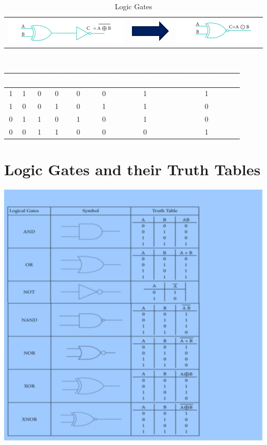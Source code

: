 \documentclass{article}
\begin{document}
\begin{table}[h!]
	\begin{center}
		\caption{Logic Gates}
		\label{tab:table1}
		\begin{tabular}{l c c}
			\includegraphics[width=0.25\linewidth]{xnor}
			&
			\includegraphics[width=0.13\linewidth]{arrow}
			&
			\includegraphics[width=0.25\linewidth]{xnor1}
			\\
		\end{tabular}
	\end{center}
\end{table}
\\
\begin{table}[h!]
	\begin{center}
		\begin{tabular}{ |c|c|c|c|c|c|c|c|}
			\cellcolor{blue!100}\textcolor{white}{\textbf{A}} & \cellcolor{blue!100}\textcolor{white}{\textbf{B}} & \cellcolor{blue!100}\textcolor{white}{\textbf{~A}} &
			\cellcolor{blue!100}\textcolor{white}{\textbf{~B}} &
			\cellcolor{blue!100}\textcolor{white}{\textbf{~A.B}} &
			\cellcolor{blue!100}\textcolor{white}{\textbf{~B.A}} &
			\cellcolor{blue!100}\textcolor{white}{\textbf{~A.B + ~B.A}} &
			\cellcolor{blue!100}\textcolor{white}{\textbf{~(~A.B + ~B.A)}}\\
			\hline
			1 & 1 & 0 & 0 & 0 & 0 & 1 & 1\\
			1 & 0 & 0 & 1 & 0 & 1 & 1 & 0\\
			0 & 1 & 1 & 0 & 1 & 0 & 1 & 0\\
			0 & 0 & 1 & 1 & 0 & 0 & 0 & 1\\
			\hline
			
		\end{tabular}
	\end{center}
\end{table}
\section{Logic Gates and their Truth Tables}
\begin{center}
	\includegraphics[width=0.5\linewidth]{logictable}
\end{center}
\newpage
\end{document}
